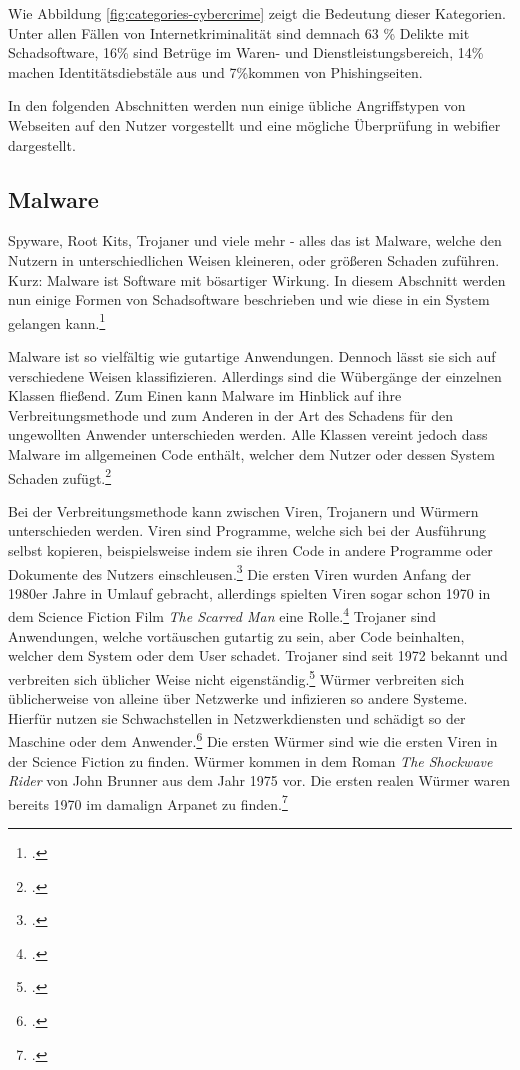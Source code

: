 Wie Abbildung \ref{fig:categories-cybercrime} zeigt die Bedeutung dieser Kategorien. Unter allen Fällen von Internetkriminalität sind demnach 63 \% Delikte mit Schadsoftware, 16\% sind Betrüge im Waren- und Dienstleistungsbereich, 14\% machen Identitätsdiebstäle aus und 7\%kommen von Phishingseiten.

In den folgenden Abschnitten werden nun einige übliche Angriffstypen von Webseiten auf den Nutzer vorgestellt und eine mögliche Überprüfung in webifier dargestellt.

\subsection{Malware}

Spyware, Root Kits, Trojaner und viele mehr - alles das ist Malware, welche den Nutzern in unterschiedlichen Weisen kleineren, oder größeren Schaden zuführen. Kurz: Malware ist Software mit bösartiger Wirkung. In diesem Abschnitt werden nun einige Formen von Schadsoftware beschrieben und wie diese in ein System gelangen kann.\footcite[Vgl.][95]{netzwerkDatensicherheit}

Malware ist so vielfältig wie gutartige Anwendungen. Dennoch lässt sie sich auf verschiedene Weisen klassifizieren. Allerdings sind die Wübergänge der einzelnen Klassen fließend. Zum Einen kann Malware im Hinblick auf ihre Verbreitungsmethode und zum Anderen in der Art des Schadens für den ungewollten Anwender unterschieden werden. Alle Klassen vereint jedoch dass Malware im allgemeinen Code enthält, welcher dem Nutzer oder dessen System Schaden zufügt.\footcite[Vgl.][95\psq]{netzwerkDatensicherheit}

Bei der Verbreitungsmethode kann zwischen Viren, Trojanern und Würmern unterschieden werden. Viren sind Programme, welche sich bei der Ausführung selbst kopieren, beispielsweise indem sie ihren Code in andere Programme oder Dokumente des Nutzers einschleusen.\footcite[Vgl.][95]{netzwerkDatensicherheit} Die ersten Viren wurden Anfang der 1980er Jahre in Umlauf gebracht, allerdings spielten Viren sogar schon 1970 in dem Science Fiction Film \textit{The Scarred Man} eine Rolle.\footcite[Vgl.][14]{virusesMalware} Trojaner sind Anwendungen, welche vortäuschen gutartig zu sein, aber Code beinhalten, welcher dem System oder dem User schadet. Trojaner sind seit 1972 bekannt und verbreiten sich üblicher Weise nicht eigenständig.\footcite[Vgl.][12\psq]{virusesMalware} Würmer verbreiten sich üblicherweise von alleine über Netzwerke und infizieren so andere Systeme. Hierfür nutzen sie Schwachstellen in Netzwerkdiensten und schädigt so der Maschine oder dem Anwender.\footcite[Vgl.][95]{netzwerkDatensicherheit} Die ersten Würmer sind wie die ersten Viren in der Science Fiction zu finden. Würmer kommen in dem Roman \textit{The Shockwave Rider} von John Brunner aus dem Jahr 1975 vor. Die ersten realen Würmer waren bereits 1970 im damalign Arpanet zu finden.\footcite[Vgl.][15]{virusesMalware}

